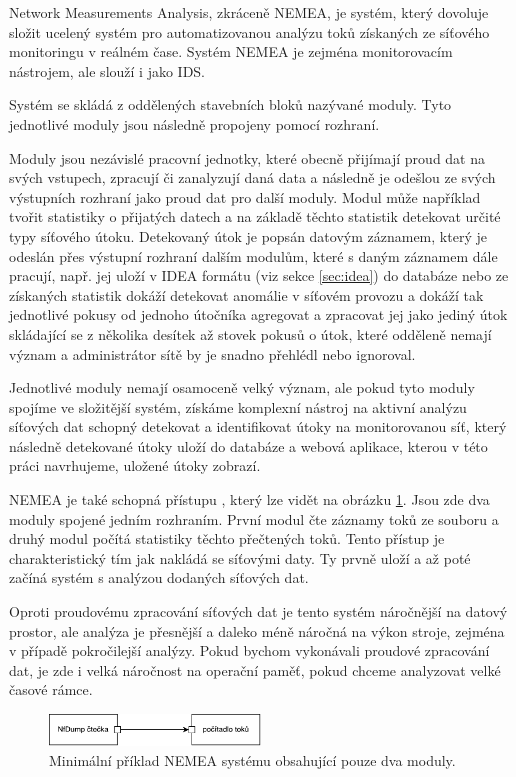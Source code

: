 Network Measurements Analysis, zkráceně NEMEA, je systém, který dovoluje složit ucelený systém pro automatizovanou analýzu toků získaných ze síťového monitoringu v reálném čase. Systém NEMEA je zejména monitorovacím nástrojem, ale slouží i jako IDS.

Systém se skládá z oddělených stavebních bloků nazývané moduly. Tyto jednotlivé moduly jsou následně propojeny pomocí rozhraní.

Moduly jsou nezávislé pracovní jednotky, které obecně přijímají proud dat na svých vstupech, zpracují či zanalyzují daná data a následně je odešlou ze svých výstupních rozhraní jako proud dat pro další moduly. Modul může například tvořit statistiky o přijatých datech a na základě těchto statistik detekovat určité typy síťového útoku. Detekovaný útok je popsán datovým záznamem, který je odeslán přes výstupní rozhraní dalším modulům, které s daným záznamem dále pracují, např. jej uloží v IDEA formátu (viz sekce \ref{sec:idea}) do databáze nebo ze získaných statistik dokáží detekovat anomálie v síťovém provozu a dokáží tak jednotlivé pokusy od jednoho útočníka agregovat a zpracovat jej jako jediný útok skládající se z několika desítek až stovek pokusů o útok, které odděleně nemají význam a administrátor sítě by je snadno přehlédl nebo ignoroval.

Jednotlivé moduly nemají osamoceně velký význam, ale pokud tyto moduly spojíme ve složitější systém, získáme komplexní nástroj na aktivní analýzu síťových dat schopný detekovat a identifikovat útoky na monitorovanou síť, který následně detekované útoky uloží do databáze a webová aplikace, kterou v této práci navrhujeme, uložené útoky zobrazí.

NEMEA je také schopná přístupu , který lze vidět na obrázku \ref{fig:nemea-schema}. Jsou zde dva moduly spojené jedním rozhraním. První modul čte záznamy toků ze souboru a druhý modul počítá statistiky těchto přečtených toků. Tento přístup je charakteristický tím jak nakládá se síťovými daty. Ty prvně uloží a až poté začíná systém s analýzou dodaných síťových dat. 

Oproti proudovému zpracování síťových dat je tento systém náročnější na datový prostor, ale analýza je přesnější a daleko méně náročná na výkon stroje, zejména v případě pokročilejší analýzy. Pokud bychom vykonávali proudové zpracování dat, je zde i velká náročnost na operační paměť, pokud chceme analyzovat velké časové rámce.

\begin{figure}[h]
    \centering
    \includegraphics[width=0.5\textwidth]{fig/nemea-basic.pdf}
    \caption{Minimální příklad NEMEA systému obsahující pouze dva moduly.} \label{fig:nemea-schema}
  
\end{figure}

